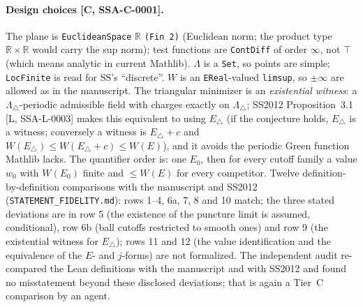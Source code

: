 \documentclass[10pt]{article}
\newcommand{\R}{\mathbb{R}}
\newcommand{\tier}[1]{\textsf{[#1]}}
\newcommand{\lean}[1]{\texttt{#1}}
\begin{document}
\paragraph{Design choices \tier{C, SSA-C-0001}.} The plane is \lean{EuclideanSpace} $\R$ \lean{(Fin 2)} (Euclidean norm; the product type $\R\times\R$ would carry the sup norm); test functions are \lean{ContDiff} of order $\infty$, not $\top$ (which means analytic in current Mathlib).
$\Lambda$ is a \lean{Set}, so points are simple; \lean{LocFinite} is read for SS's ``discrete''. $W$ is an \lean{EReal}-valued \lean{limsup}, so $\pm\infty$ are allowed as in the manuscript.
The triangular minimizer is an \emph{existential witness}: a $\Lambda_\triangle$-periodic admissible field with charges exactly on $\Lambda_\triangle$; SS2012 Proposition~3.1 \tier{L, SSA-L-0003} makes this equivalent to using $E_\triangle$
(if the conjecture holds, $E_\triangle$ is a witness; conversely a witness is $E_\triangle+c$ and $W(E_\triangle)\le W(E_\triangle+c)\le W(E)$), and it avoids the periodic Green function Mathlib lacks.
The quantifier order is: one $E_0$, then for every cutoff family a value $w_0$ with $W(E_0)$ finite and $\le W(E)$ for every competitor.
Twelve definition-by-definition comparisons with the manuscript and SS2012 (\texttt{STATEMENT\_FIDELITY.md}): rows 1--4, 6a, 7, 8 and 10 match; the three stated deviations are in row 5 (the existence of the puncture limit is assumed, conditional), row 6b (ball cutoffs restricted to smooth ones) and row 9 (the existential witness for $E_\triangle$); rows 11 and 12 (the value identification and the equivalence of the $E$- and $j$-forms) are not formalized. The independent audit re-compared the Lean definitions with the manuscript and with SS2012 and found no misstatement beyond these disclosed deviations; that is again a Tier~C comparison by an agent.


\end{document}
